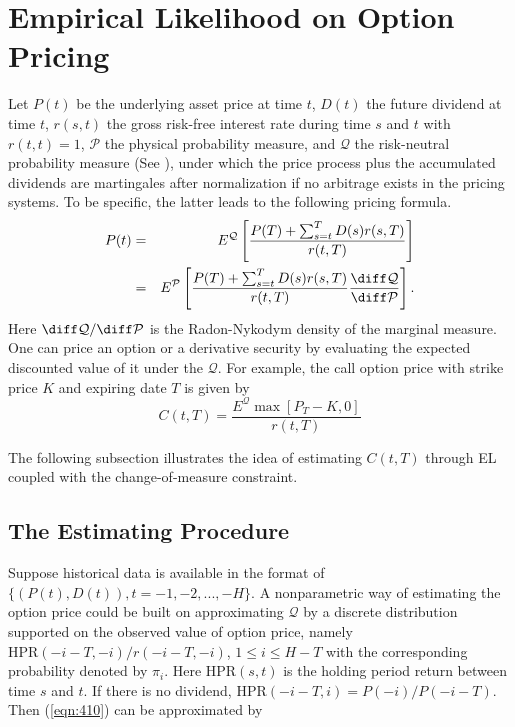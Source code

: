  
\section{Empirical Likelihood on Option Pricing}
Let $P(t)$ be the underlying asset price at time $t$, $D(t)$  the future dividend at time $t$, $r(s,t)$ the gross risk-free interest rate during time $s$ and $t$ with $r(t,t)=1$,  $\mathcal{P}$ the physical probability measure, and $\mathcal{Q}$  the risk-neutral probability measure (See \citet{huang1988foundations}), under which the price process plus the accumulated dividends are martingales after normalization if no arbitrage exists in the pricing systems. To be specific, the latter leads to the following pricing formula.
\begin{eqnarray}
P(t)&=&E^{\mathcal{Q}}\left[\frac{P(T)+\sum_{s=t}^{T}D(s)r(s,T)}{r(t,T)}\right]\label{eqn:410}\\
&=&E^{\mathcal{P}}\left[\frac{P(T)+\sum_{s=t}^{T}D(s)r(s,T)}{r(t,T)}\frac{\diff\mathcal{Q}}{\diff\mathcal{P}}\right].\nonumber
\end{eqnarray}
Here $\diff\mathcal{Q}/ \diff\mathcal{P}$ is the Radon-Nykodym density of the marginal measure. One can price an option or a derivative security by evaluating the expected discounted value of it under the $\mathcal{Q}$. For example, the call option price with strike price $K$ and expiring date $T$ is given by
\begin{equation}\label{eqn:4102}
C(t,T)=\frac{E ^{\mathcal{Q}}  \max[P_T - K,0]   }{r(t,T)} 
\end{equation} 

The following subsection illustrates the idea of estimating $C(t,T)$  through EL coupled with the change-of-measure constraint. 

\subsection{The Estimating Procedure}
Suppose historical data is available in the format of $\{(P(t),D(t)),t=-1,-2,...,-H\}$. A nonparametric way of estimating the option price could be built on approximating $\mathcal{Q}$ by a discrete distribution supported on the observed value of option price, namely $\mathrm{HPR}(-i-T,-i)/r(-i-T,-i)$, $1\leq i\leq H-T$ with the corresponding probability denoted by $\pi_i$. Here $\mathrm{HPR}(s,t)$ is the holding period return between time $s$ and $t$. If there is no dividend, $\mathrm{HPR}(-i-T,i)=P(-i)/P(-i-T)$. Then (\ref{eqn:410}) can be approximated by 

